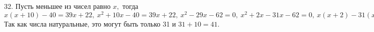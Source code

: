32. Пусть меньшее из чисел равно $x,$ тогда $x(x+10)-40=39x+22,\ x^2+10x-40=39x+22,\ x^2-29x-62=0,\ x^2+2x-31x-62=0,\ x(x+2)-31(x+2)=0,\ (x-31)(x+2)=0.$ Так как числа натуральные, это могут быть только 31 и $31+10=41.$\\
